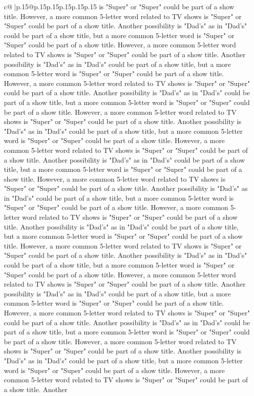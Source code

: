 \documentclass{article}
\begin{document}
{\begin{supertabular}{c@{$\;$}|p{.15\linewidth}@{}p{.15\linewidth}p{.15\linewidth}p{.15\linewidth}p{.15\linewidth}p{.15\linewidth}}
{{{is "Super" or "Super" could be part of a show title. However, a more common 5{-}letter word related to TV shows is "Super" or "Super" could be part of a show title. Another possibility is "Dad's" as in "Dad's" could be part of a show title, but a more common 5{-}letter word is "Super" or "Super" could be part of a show title. However, a more common 5{-}letter word related to TV shows is "Super" or "Super" could be part of a show title. Another possibility is "Dad's" as in "Dad's" could be part of a show title, but a more common 5{-}letter word is "Super" or "Super" could be part of a show title. However, a more common 5{-}letter word related to TV shows is "Super" or "Super" could be part of a show title. Another possibility is "Dad's" as in "Dad's" could be part of a show title, but a more common 5{-}letter word is "Super" or "Super" could be part of a show title. However, a more common 5{-}letter word related to TV shows is "Super" or "Super" could be part of a show title. Another possibility is "Dad's" as in "Dad's" could be part of a show title, but a more common 5{-}letter word is "Super" or "Super" could be part of a show title. However, a more common 5{-}letter word related to TV shows is "Super" or "Super" could be part of a show title. Another possibility is "Dad's" as in "Dad's" could be part of a show title, but a more common 5{-}letter word is "Super" or "Super" could be part of a show title. However, a more common 5{-}letter word related to TV shows is "Super" or "Super" could be part of a show title. Another possibility is "Dad's" as in "Dad's" could be part of a show title, but a more common 5{-}letter word is "Super" or "Super" could be part of a show title. However, a more common 5{-}letter word related to TV shows is "Super" or "Super" could be part of a show title. Another possibility is "Dad's" as in "Dad's" could be part of a show title, but a more common 5{-}letter word is "Super" or "Super" could be part of a show title. However, a more common 5{-}letter word related to TV shows is "Super" or "Super" could be part of a show title. Another possibility is "Dad's" as in "Dad's" could be part of a show title, but a more common 5{-}letter word is "Super" or "Super" could be part of a show title. However, a more common 5{-}letter word related to TV shows is "Super" or "Super" could be part of a show title. Another possibility is "Dad's" as in "Dad's" could be part of a show title, but a more common 5{-}letter word is "Super" or "Super" could be part of a show title. However, a more common 5{-}letter word related to TV shows is "Super" or "Super" could be part of a show title. Another possibility is "Dad's" as in "Dad's" could be part of a show title, but a more common 5{-}letter word is "Super" or "Super" could be part of a show title. However, a more common 5{-}letter word related to TV shows is "Super" or "Super" could be part of a show title. Another possibility is "Dad's" as in "Dad's" could be part of a show title, but a more common 5{-}letter word is "Super" or "Super" could be part of a show title. However, a more common 5{-}letter word related to TV shows is "Super" or "Super" could be part of a show title. Another }}}
\end{supertabular}}
\end{document}
